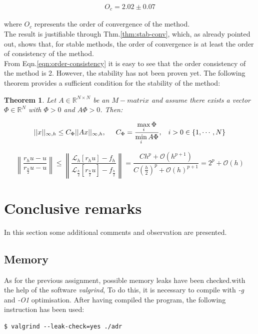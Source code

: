 \documentclass[11pt]{article}
\theoremstyle{theorem}
\newtheorem{theorem}{Theorem}
\theoremstyle{definition}
\begin{document}
\begin{align}
	\label{eqn:order-of-convergence}
	O_c = 2.02 \pm 0.07
\end{align} 

where $O_c$ represents the order of convergence of the method.\\
The result is justifiable through Thm.\ref{thm:stab-conv}, which, as already pointed out, shows that, for stable methods, the order of convergence is at least the order of consistency of the method.\\
From Eqn.\eqref{eqn:order-consistency} it is easy to see that the order consistency of the method is 2. However, the stability has not been proven yet. The following theorem provides a sufficient condition for the stability of the method:

\begin{theorem}
	\label{thm:stability-thm}
	Let $A\in\mathbb{R}^{N\times N}$ be an $M-matrix$ and assume there exists a vector $\Phi\in\mathbb{R}^{N}$ with $\Phi>0$ and $A\Phi >0$. Then:
	
	$$||x||_{\infty, h}\le C_\Phi||Ax||_{\infty, h}, \hspace{5mm}C_\Phi=\frac{\max\limits_{i}\Phi}{\min\limits_{i} A\Phi},\hspace{3mm} i>0\in\lbrace 1,\cdots, N\rbrace$$
\end{theorem}



$$\left\|\frac{r_hu-u}{r_{\frac{h}{2}}u-u}\right\|\le\left\|\frac{\mathcal{L}_h[r_hu]-f_h}{\mathcal{L}_{\frac{h}{2}}\left[r_\frac{h}{2}u\right]-f_\frac{h}{2}}\right\|=\frac{Ch^p+\mathcal{O}(h^{p+1})}{C\left(\frac{h}{2}\right)^p+\mathcal{O}(h)^{p+1}}= 2^p+\mathcal{O}(h)$$


\section{Conclusive remarks}
In this section some additional comments and observation are presented.

\subsection{Memory}
As for the previous assignment, possible memory leaks have been checked.with the help of the software \emph{valgrind}, To do this, it is necessary to compile with \emph{-g} and \emph{-O1} optimisation. After having compiled the program, the following instruction has been used:


\begin{lstlisting}
$ valgrind --leak-check=yes ./adr
\end{lstlisting}
\end{document}
